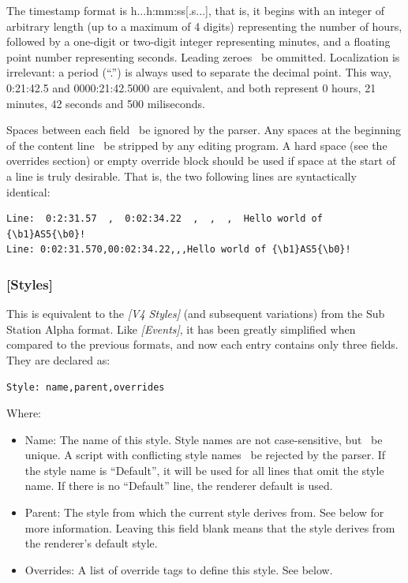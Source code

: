 \documentclass{spec}
\begin{document}
The timestamp format is h...h:mm:ss[.s...], that is, it begins with an integer of arbitrary length
(up to a maximum of 4 digits) representing the number of hours, followed by a one-digit or two-digit integer
representing minutes, and a floating point number representing seconds. Leading zeroes \may\ be ommitted.
Localization is irrelevant: a period (``.'') is always used to separate the decimal point. This way,
0:21:42.5 and 0000:21:42.5000 are equivalent, and both represent 0 hours, 21 minutes, 42 seconds and 500 miliseconds.

Spaces between each field \must\ be ignored by the parser. Any spaces at the beginning of the
content line \should\ be stripped by any editing program. A hard space (see the overrides section) or empty
override block should be used if space at the start of a line is truly desirable. That is, the two
following lines are syntactically identical:

\begin{verbatim}
Line:  0:2:31.57  ,  0:02:34.22  ,  ,  ,  Hello world of {\b1}AS5{\b0}!
Line: 0:02:31.570,00:02:34.22,,,Hello world of {\b1}AS5{\b0}!
\end{verbatim}


\subsubsection{[Styles]}

This is equivalent to the \emph{[V4 Styles]} (and subsequent variations) from the Sub Station Alpha format.
Like \emph{[Events]}, it has been greatly simplified when compared to the previous formats, and now
each entry contains only three fields. They are declared as:

\begin{verbatim}
Style: name,parent,overrides
\end{verbatim}

Where:

\begin{itemize}
\item Name: The name of this style. Style names are not case-sensitive, but \must\ be unique. A
script with conflicting style names \must\ be rejected by the parser. If the style name is ``Default'', it
will be used for all lines that omit the style name. If there is no ``Default'' line, the renderer
default is used.
\item Parent: The style from which the current style derives from. See below for more information.
Leaving this field blank means that the style derives from the renderer's default style.
\item Overrides: A list of override tags to define this style. See below.
\end{itemize}
\end{document}
